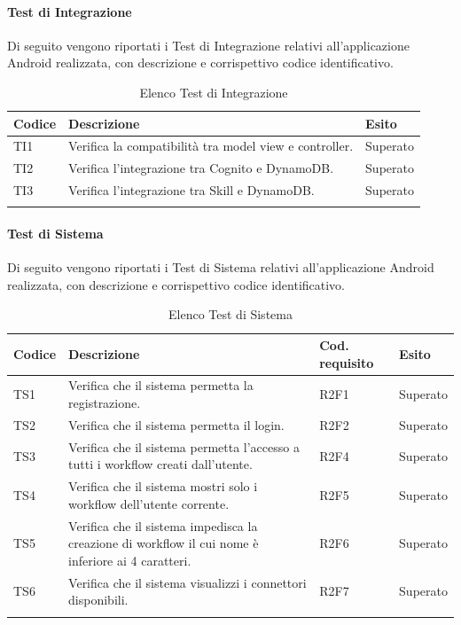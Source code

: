 \paragraph{Test di Integrazione}
\label{sec:tiRP}
Di seguito vengono riportati i Test di Integrazione relativi all'applicazione Android realizzata, con descrizione e corrispettivo codice identificativo.
\begin{center}
	\centering
	\renewcommand{\arraystretch}{1.5}
	\begin{longtable}{  p{1.5cm}  p{10.5cm} p{2cm}  }
		\rowcolor{tableHeadYellow}
		\textbf{Codice}   & \textbf{Descrizione} & \textbf{Esito} \\ 
		\endhead
		TI1 & Verifica la compatibilità tra model view e controller.  & Superato \\
		TI2 & Verifica l’integrazione tra Cognito e DynamoDB. & Superato \\
		TI3 & Verifica l’integrazione tra Skill e DynamoDB. & Superato \\
		\rowcolor{white}
		\caption{Elenco Test di Integrazione}
	\end{longtable}
\end{center}
\paragraph{Test di Sistema}
\label{sec:tsRP}
Di seguito vengono riportati i Test di Sistema relativi all'applicazione Android realizzata, con descrizione e corrispettivo codice identificativo.
\begin{center}
	\centering
	\renewcommand{\arraystretch}{1.5}
	\begin{longtable}{  p{1.2cm}  p{8.5cm} p{2cm} p{1.5cm} }
		\rowcolor{tableHeadYellow}
		\textbf{Codice}   & \textbf{Descrizione} & \textbf{Cod. \mbox{requisito}} & \textbf{Esito} \\ 
		\endhead
		TS1 & Verifica che il sistema permetta la registrazione. & R2F1 & Superato \\
		TS2 & Verifica che il sistema permetta il login. & R2F2 & Superato \\
		TS3 & Verifica che il sistema permetta l’accesso a tutti i workflow creati dall’utente. & R2F4 & Superato \\
		TS4 & Verifica che il sistema mostri solo i workflow dell’utente corrente. & R2F5 & Superato \\
		TS5 & Verifica che il sistema impedisca la creazione di workflow il cui nome è inferiore ai 4 caratteri. & R2F6 & Superato \\
		TS6 & Verifica che il sistema visualizzi i connettori disponibili. & R2F7 & Superato \\
		\rowcolor{white}
		\caption{Elenco Test di Sistema}
	\end{longtable}
\end{center}
